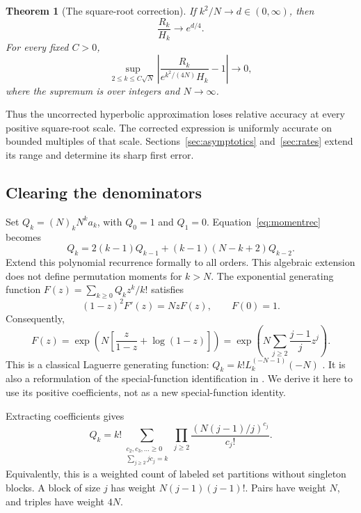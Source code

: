 \documentclass[11pt]{article}
\newtheorem{theorem}{Theorem}[section]
\theoremstyle{definition}
\theoremstyle{remark}
\newcommand{\1}{\mathbf 1}
\begin{document}
\begin{theorem}[The square-root correction]\label{thm:sqrt}
If $k^2/N\to d\in(0,\infty)$, then
\begin{equation}\label{eq:sqrtlimit}
\frac{R_k}{H_k}\longrightarrow e^{d/4}.
\end{equation}
For every fixed $C>0$,
\begin{equation}\label{eq:uniformsqrt}
\sup_{2\le k\le C\sqrt N}
\left|\frac{R_k}{e^{k^2/(4N)}H_k}-1\right|\longrightarrow0,
\end{equation}
where the supremum is over integers and $N\to\infty$.
\end{theorem}

Thus the uncorrected hyperbolic approximation loses relative accuracy at every positive square-root scale. The corrected expression is uniformly accurate on bounded multiples of that scale. Sections~\ref{sec:asymptotics} and~\ref{sec:rates} extend its range and determine its sharp first error.

\subsection{Clearing the denominators}

Set $Q_k=(N)_kN^ka_k$, with $Q_0=1$ and $Q_1=0$. Equation~\eqref{eq:momentrec} becomes
\begin{equation}\label{eq:qrec}
Q_k=2(k-1)Q_{k-1}+(k-1)(N-k+2)Q_{k-2}.
\end{equation}
Extend this polynomial recurrence formally to all orders. This algebraic extension does not define permutation moments for $k>N$. The exponential generating function $F(z)=\sum_{k\ge0}Q_kz^k/k!$ satisfies
\[
(1-z)^2F'(z)=NzF(z),\qquad F(0)=1.
\]
Consequently,
\begin{equation}\label{eq:egf}
F(z)=\exp\left(N\left[\frac z{1-z}+\log(1-z)\right]\right)
=\exp\left(N\sum_{j\ge2}\frac{j-1}{j}z^j\right).
\end{equation}
This is a classical Laguerre generating function: $Q_k=k!L_k^{(-N-1)}(-N)$ \cite[equations 18.5.12 and 18.12.13]{DLMF}. It is also a reformulation of the special-function identification in \cite[Remark 3.5]{CN}. We derive it here to use its positive coefficients, not as a new special-function identity.

Extracting coefficients gives
\begin{equation}\label{eq:partitions}
Q_k=k!\sum_{\substack{c_2,c_3,\ldots\ge0\\\sum_{j\ge2}jc_j=k}}
\prod_{j\ge2}\frac{(N(j-1)/j)^{c_j}}{c_j!}.
\end{equation}
Equivalently, this is a weighted count of labeled set partitions without singleton blocks. A block of size $j$ has weight $N(j-1)(j-1)!$. Pairs have weight $N$, and triples have weight $4N$.
\end{document}
